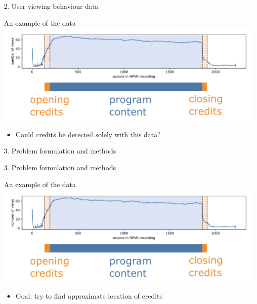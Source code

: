 \documentclass[first=orange,second=blue,logo=blueque]{aaltoslides}
\begin{document}

\begin{frame}{2. User viewing behaviour data}
    \begin{block}{{\color{black}An example of the data}}
        \center
        \includegraphics[width=1\textwidth]{figures/data1.pdf}
        \begin{itemize}
            \item Could credits be detected solely with this data?
        \end{itemize}
    \end{block}
\end{frame}


\begin{frame}{3. Problem formulation and methods}
\end{frame}


\begin{frame}{3. Problem formulation and methods}
    \begin{block}{{\color{black}An example of the data}}
        \center
        \includegraphics[width=1\textwidth]{figures/data1.pdf}
        \begin{itemize}
            \item Goal: try to find approximate location of credits
        \end{itemize}
    \end{block}
\end{frame}
\end{document}
